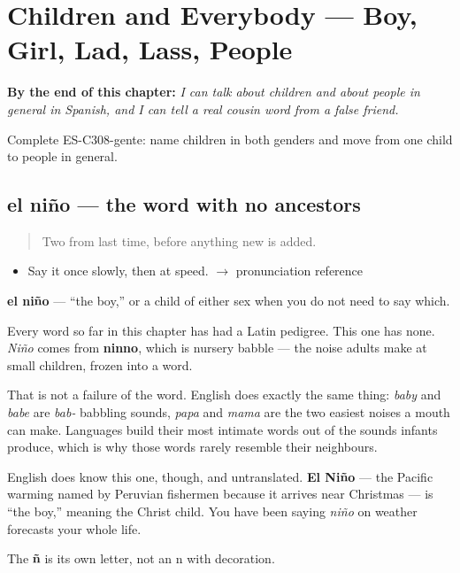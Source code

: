 
\chapter{Children and Everybody --- Boy, Girl, Lad, Lass, People}
\label{ch:ninos-y-gente}

\begin{chapteropening}
\textbf{By the end of this chapter:} \emph{I can talk about children and about people in general in Spanish, and I can tell a real cousin word from a false friend.}

Complete ES-C308-gente: name children in both genders and move from one child to people in general.
\end{chapteropening}

\section[el niño]{el niño --- the word with no ancestors}

\label{lesson:ES-C308-nino}



\begin{quote}
Two from last time, before anything new is added.
\end{quote}

\begin{sounds}
\begin{itemize}
\raggedright
  \item Say it once slowly, then at speed. $\to$ pronunciation reference
\end{itemize}
\end{sounds}

\begin{cousinweb}
\textbf{el niño} --- \textquotedblleft{}the boy,\textquotedblright{} or a child of either sex when you do not need to say which.

Every word so far in this chapter has had a Latin pedigree. This one has none. \emph{Niño} comes from \textbf{ninno}, which is nursery babble --- the noise adults make at small children, frozen into a word.

That is not a failure of the word. English does exactly the same thing: \emph{baby} and \emph{babe} are \emph{bab-} babbling sounds, \emph{papa} and \emph{mama} are the two easiest noises a mouth can make. Languages build their most intimate words out of the sounds infants produce, which is why those words rarely resemble their neighbours.

English does know this one, though, and untranslated. \textbf{El Niño} --- the Pacific warming named by Peruvian fishermen because it arrives near Christmas --- is \textquotedblleft{}the boy,\textquotedblright{} meaning the Christ child. You have been saying \emph{niño} on weather forecasts your whole life.

The \textbf{ñ} is its own letter, not an n with decoration.
\end{cousinweb}

